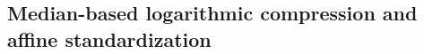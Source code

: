 \documentclass{bmcart}
\makeatletter
\newcommand*{\eg}{e.g.,\@\xspace}
\makeatother
\begin{document}
%



\subsection*{Median-based logarithmic compression and affine standardization}
\label{sec:gaussianization}
\end{document}
